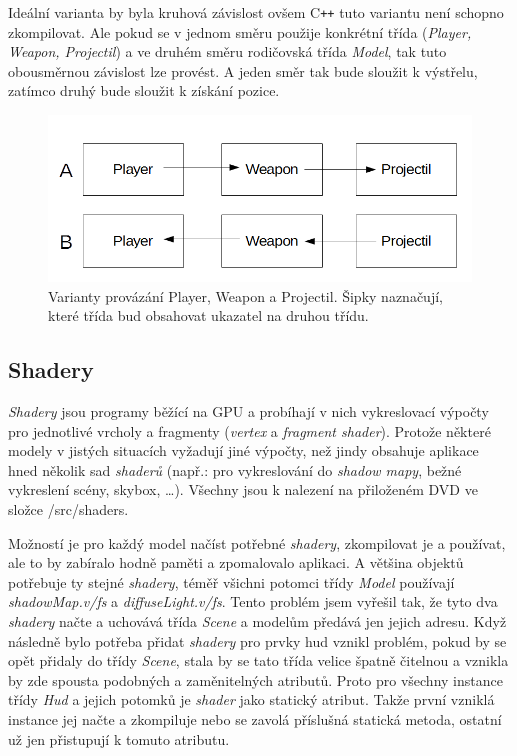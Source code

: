 Ideální varianta by byla kruhová závislost ovšem C\texttt{++} tuto variantu není schopno zkompilovat. Ale pokud se v jednom směru použije konkrétní třída (\emph{Player, Weapon, Projectil}) a ve druhém směru rodičovská třída \emph{Model}, tak tuto obousměrnou závislost lze provést. A jeden směr tak bude sloužit k výstřelu, zatímco druhý bude sloužit k získání pozice.
    \begin{figure}
	\begin{center}
		\includegraphics[scale = 0.6]{obrazky-figures/PWP}
		\caption{Varianty provázání Player, Weapon a Projectil. Šipky naznačují, které třída bud obsahovat ukazatel na druhou třídu.}\label{PWPpicture}
\end{center}\end{figure}
\subsection{Shadery}
\emph{Shadery} jsou programy běžící na GPU a probíhají v nich vykreslovací výpočty pro jednotlivé vrcholy a fragmenty (\emph{vertex} a \emph{fragment shader}). Protože některé modely v jistých situacích vyžadují jiné výpočty, než jindy obsahuje aplikace hned několik sad \emph{shaderů} (např.: pro vykreslování do \emph{shadow mapy}, bežné vykreslení scény, skybox, \dots). Všechny jsou k nalezení na přiloženém DVD ve složce /src/shaders. 

 Možností je pro každý model načíst potřebné \emph{shadery}, zkompilovat je a používat, ale to by zabíralo hodně paměti a zpomalovalo aplikaci. A většina objektů potřebuje ty stejné \emph{shadery}, téměř všichni potomci třídy \emph{Model} používají \emph{shadowMap.v/fs} a \emph{diffuseLight.v/fs}. Tento problém jsem vyřešil tak, že tyto dva \emph{shadery} načte a uchovává třída \emph{Scene} a modelům předává jen jejich adresu. Když následně bylo potřeba přidat \emph{shadery} pro prvky hud vznikl problém, pokud by se opět přidaly do třídy \emph{Scene}, stala by se tato třída velice špatně čitelnou a vznikla by zde spousta podobných a zaměnitelných atributů. Proto pro všechny instance třídy \emph{Hud} a jejich potomků je \emph{shader} jako statický atribut. Takže první vzniklá instance jej načte a zkompiluje nebo se zavolá příslušná statická metoda, ostatní už jen přistupují k tomuto atributu. 
 
